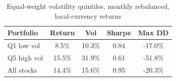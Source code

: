 \begin{table}[H]
\centering
\caption{Equal-weight volatility quintiles, monthly rebalanced, local-currency returns}
\begin{tabular}{lcccc}
\toprule
Portfolio & Return & Vol & Sharpe & Max DD \\
\midrule
Q1 low vol & 8.5\% & 10.3\% & 0.84 & -17.0\% \\
Q5 high vol & 15.5\% & 31.9\% & 0.61 & -51.8\% \\
All stocks & 14.4\% & 15.6\% & 0.95 & -20.3\% \\
\bottomrule
\end{tabular}
\end{table}
